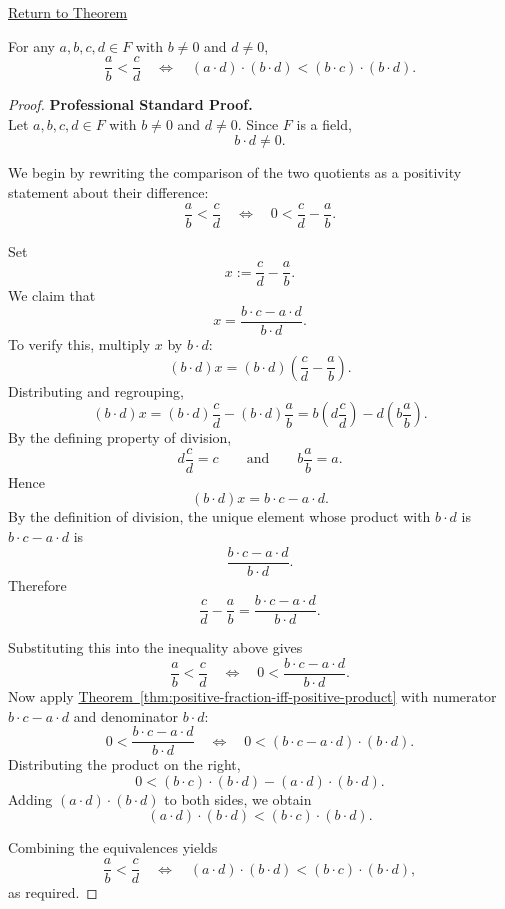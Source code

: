 \newpage
{}
\label{prf:fraction-order-comparison-general}

\begin{remark*}[Return]
\hyperref[thm:fraction-order-comparison-general]{Return to Theorem}
\end{remark*}

\begin{theorem*}
For any $a,b,c,d\in F$ with $b\neq 0$ and $d\neq 0$,
\[
\frac{a}{b}<\frac{c}{d}
\quad\Longleftrightarrow\quad
(a\cdot d)\cdot(b\cdot d)<(b\cdot c)\cdot(b\cdot d).
\]
\end{theorem*}

\begin{proof}
\textbf{Professional Standard Proof.}~\\
Let $a,b,c,d\in F$ with $b\neq 0$ and $d\neq 0$.  Since $F$ is a field,
\[
b\cdot d\neq 0.
\]

We begin by rewriting the comparison of the two quotients as a positivity
statement about their difference:
\[
\frac{a}{b}<\frac{c}{d}
\quad\Longleftrightarrow\quad
0<\frac{c}{d}-\frac{a}{b}.
\]

Set
\[
x:=\frac{c}{d}-\frac{a}{b}.
\]
We claim that
\[
x=\frac{b\cdot c-a\cdot d}{b\cdot d}.
\]
To verify this, multiply $x$ by $b\cdot d$:
\[
(b\cdot d)x
=(b\cdot d)\left(\frac{c}{d}-\frac{a}{b}\right).
\]
Distributing and regrouping,
\[
(b\cdot d)x
=(b\cdot d)\frac{c}{d}-(b\cdot d)\frac{a}{b}
=b\left(d\frac{c}{d}\right)-d\left(b\frac{a}{b}\right).
\]
By the defining property of division,
\[
d\frac{c}{d}=c
\qquad\text{and}\qquad
b\frac{a}{b}=a.
\]
Hence
\[
(b\cdot d)x=b\cdot c-a\cdot d.
\]
By the definition of division, the unique element whose product with
$b\cdot d$ is $b\cdot c-a\cdot d$ is
\[
\frac{b\cdot c-a\cdot d}{b\cdot d}.
\]
Therefore
\[
\frac{c}{d}-\frac{a}{b}=\frac{b\cdot c-a\cdot d}{b\cdot d}.
\]

Substituting this into the inequality above gives
\[
\frac{a}{b}<\frac{c}{d}
\quad\Longleftrightarrow\quad
0<\frac{b\cdot c-a\cdot d}{b\cdot d}.
\]
Now apply
\hyperref[thm:positive-fraction-iff-positive-product]{Theorem~\ref*{thm:positive-fraction-iff-positive-product}}
with numerator $b\cdot c-a\cdot d$ and denominator $b\cdot d$:
\[
0<\frac{b\cdot c-a\cdot d}{b\cdot d}
\quad\Longleftrightarrow\quad
0<(b\cdot c-a\cdot d)\cdot(b\cdot d).
\]
Distributing the product on the right,
\[
0<(b\cdot c)\cdot(b\cdot d)-(a\cdot d)\cdot(b\cdot d).
\]
Adding $(a\cdot d)\cdot(b\cdot d)$ to both sides, we obtain
\[
(a\cdot d)\cdot(b\cdot d)<(b\cdot c)\cdot(b\cdot d).
\]

Combining the equivalences yields
\[
\frac{a}{b}<\frac{c}{d}
\quad\Longleftrightarrow\quad
(a\cdot d)\cdot(b\cdot d)<(b\cdot c)\cdot(b\cdot d),
\]
as required.
\end{proof}

